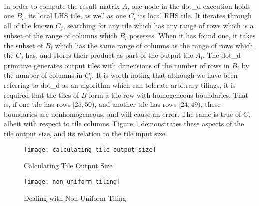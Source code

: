 \paragraph{}
In order to compute the result matrix $A$, one node in the dot\_d execution holds one $B_i$, its local LHS tile, as well as one $C_i$ its local RHS tile. It iterates through all of the known $C_j$, searching for any tile which has any range of rows which is a subset of the range of columns which $B_i$ posesses. When it has found one, it takes the subset of $B_i$ which has the same range of columns as the range of rows which the $C_j$ has, and stores their product as part of the output tile $A_i$. The dot\_d primitive generates output tiles with dimensions of the number of rows in $B_i$ by the number of columns in $C_i$. It is worth noting that although we have been referring to dot\_d as an algorithm which can tolerate arbitrary tilings, it is required that the tiles of $B$ form a tile row with homogeneous boundaries. That is, if one tile has rows $[25,50)$, and another tile has rows $[24,49)$, these boundaries are nonhomogeneous, and will cause an error. The same is true of $C$, albeit with respect to tile columns. Figure \ref{Fig_6} demonstrates these aspects of the tile output size, and its relation to the tile input size.

\begin{figure}
	\centering
	\texttt{[image: calculating\_tile\_output\_size]}
	\caption{Calculating Tile Output Size}
	\label{Fig_6}
\end{figure}

\begin{figure}
	\centering
	\texttt{[image: non\_uniform\_tiling]}
	\caption{Dealing with Non-Uniform Tiling}
	\label{Fig_7}
\end{figure}

